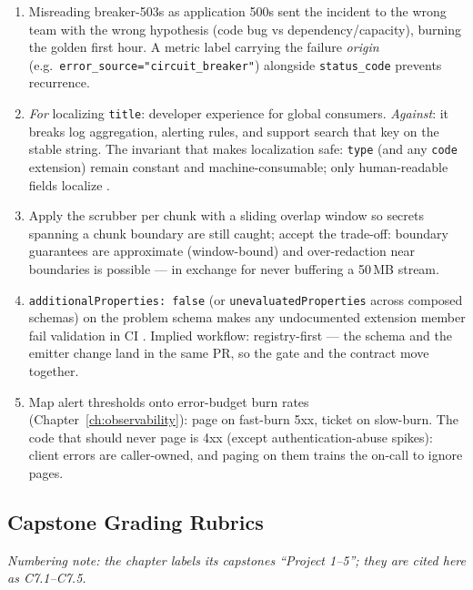 \begin{enumerate}[leftmargin=2.2em]
    decimal positions). Per RFC~6901 escaping, \texttt{\textasciitilde}
    becomes \texttt{\textasciitilde 0} and \texttt{/} becomes
    \texttt{\textasciitilde 1}, so a key \texttt{a/b} is addressed as
    \texttt{/a\textasciitilde 1b}. The pointer must survive this escaping
    round-trip exactly.
  \item Misreading breaker-503s as application 500s sent the incident to the
    wrong team with the wrong hypothesis (code bug vs dependency/capacity),
    burning the golden first hour. A metric label carrying the failure
    \emph{origin} (e.g.\ \texttt{error\_source="circuit\_breaker"})
    alongside \texttt{status\_code} prevents recurrence.
  \item \emph{For} localizing \texttt{title}: developer experience for
    global consumers. \emph{Against}: it breaks log aggregation, alerting
    rules, and support search that key on the stable string. The invariant
    that makes localization safe: \texttt{type} (and any \texttt{code}
    extension) remain constant and machine-consumable; only human-readable
    fields localize \cite{rfc9457}.
  \item Apply the scrubber per chunk with a sliding overlap window so
    secrets spanning a chunk boundary are still caught; accept the
    trade-off: boundary guarantees are approximate (window-bound) and
    over-redaction near boundaries is possible --- in exchange for never
    buffering a 50\,MB stream.
  \item \texttt{additionalProperties: false} (or
    \texttt{unevaluatedProperties} across composed schemas) on the problem
    schema makes any undocumented extension member fail validation in CI
    \cite{jsonschemadocs}. Implied workflow: registry-first --- the schema
    and the emitter change land in the same PR, so the gate and the
    contract move together.
  \item Map alert thresholds onto error-budget burn rates
    (Chapter~\ref{ch:observability}): page on fast-burn 5xx, ticket on
    slow-burn. The code that should never page is 4xx (except
    authentication-abuse spikes): client errors are caller-owned, and paging
    on them trains the on-call to ignore pages.
\end{enumerate}

\subsection{Capstone Grading Rubrics}

\emph{Numbering note: the chapter labels its capstones ``Project 1--5'';
they are cited here as C7.1--C7.5.}

